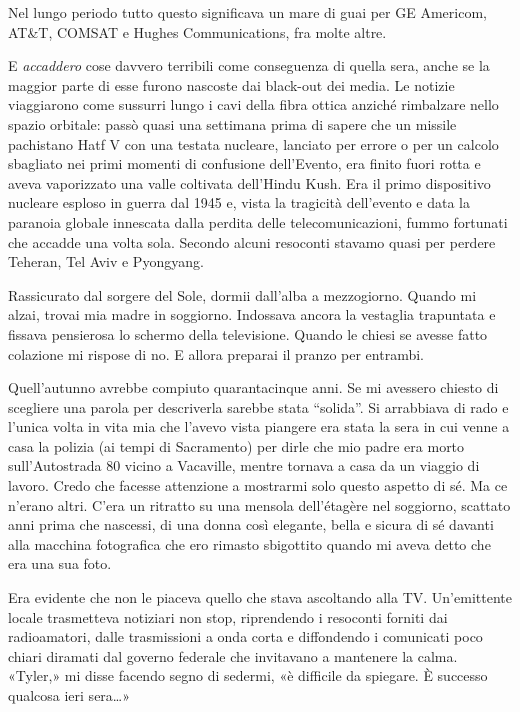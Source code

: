 Nel lungo periodo tutto questo significava un mare di guai per GE
Americom, AT\&T, COMSAT e Hughes Communications, fra molte altre.

E \emph{accaddero} cose davvero terribili come conseguenza di quella
sera, anche se la maggior parte di esse furono nascoste dai black-out
dei media. Le notizie viaggiarono come sussurri lungo i cavi della fibra
ottica anziché rimbalzare nello spazio orbitale: passò quasi una
settimana prima di sapere che un missile pachistano Hatf V con una
testata nucleare, lanciato per errore o per un calcolo sbagliato nei
primi momenti di confusione dell'Evento, era finito fuori rotta e aveva
vaporizzato una valle coltivata dell'Hindu Kush. Era il primo
dispositivo nucleare esploso in guerra dal 1945 e, vista la tragicità
dell'evento e data la paranoia globale innescata dalla perdita delle
telecomunicazioni, fummo fortunati che accadde una volta sola. Secondo
alcuni resoconti stavamo quasi per perdere Teheran, Tel Aviv e
Pyongyang.

\separatorefiori

Rassicurato dal sorgere del Sole, dormii dall'alba a mezzogiorno. Quando
mi alzai, trovai mia madre in soggiorno. Indossava ancora la vestaglia
trapuntata e fissava pensierosa lo schermo della televisione. Quando le
chiesi se avesse fatto colazione mi rispose di no. E allora preparai il
pranzo per entrambi.

Quell'autunno avrebbe compiuto quarantacinque anni. Se mi avessero
chiesto di scegliere una parola per descriverla sarebbe stata
``solida''. Si arrabbiava di rado e l'unica volta in vita mia che
l'avevo vista piangere era stata la sera in cui venne a casa la polizia
(ai tempi di Sacramento) per dirle che mio padre era morto
sull'Autostrada 80 vicino a Vacaville, mentre tornava a casa da un
viaggio di lavoro. Credo che facesse attenzione a mostrarmi solo questo
aspetto di sé. Ma ce n'erano altri. C'era un ritratto su una mensola
dell'étagère nel soggiorno, scattato anni prima che nascessi, di una
donna così elegante, bella e sicura di sé davanti alla macchina
fotografica che ero rimasto sbigottito quando mi aveva detto che era una
sua foto.

Era evidente che non le piaceva quello che stava ascoltando alla TV.
Un'emittente locale trasmetteva notiziari non stop, riprendendo i
resoconti forniti dai radioamatori, dalle trasmissioni a onda corta e
diffondendo i comunicati poco chiari diramati dal governo federale che
invitavano a mantenere la calma. «Tyler,» mi disse facendo segno di
sedermi, «è difficile da spiegare. È successo qualcosa ieri sera\ldots»

